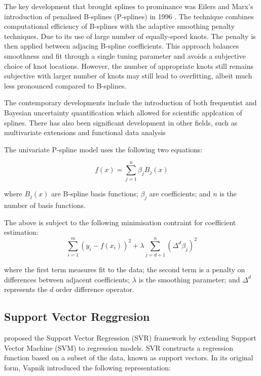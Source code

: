 \documentclass[8pt,twocolumn]{article}
\begin{document}
The key development that brought splines to prominance was Eilers and Marx's introduction
of penalised B-splines (P-splines) in 1996 \cite{eilmarx1996}. The technique combines computational
efficiency of B-splines with the adaptive smoothing penalty techniques. Due to its use of large
number of equally-spced knots. The penalty is then applied between adjacing B-spline coefficients.
This approach balances smoothness and fit through a single tuning parameter and avoids a subjective choice
of knot locations. However, the number of appropriate knots still remains subjective with larger number
of knots may still lead to overfitting, albeit much less pronounced compared to B-splines.

The contemporary developments include the introduction of both frequentist \cite{krivo2008} and
Bayesian \cite{woods2017} uncertainty quantification which allowed for scientific applcation of splines. There has also been
significant development in other fields, such as multivariate extensions and functional data analysis \cite{woods2017}

The univariate P-spline model uses the following two equations:

\begin{equation}
    f(x) = \sum_{j=1}^{n} \beta_j B_j(x)
\end{equation}

where $B_j(x)$ are B-spline basis functions; $\beta_j$ are coefficients;
and $n$ is the number of basis functions.

The above is subject to the following minimisation contraint for coefficient estimation:
\begin{equation}
    \sum_{i=1}^{m} (y_i - f(x_i))^2 + \lambda \sum_{j=d+1}^{n} (\Delta^d \beta_j)^2
\end{equation}

where the first term measures fit to the data; the second term is a penalty on differences between adjacent coefficients;
$\lambda$ is the smoothing parameter; and $\Delta^d$ represents the $d$ order difference operator.


\subsection{Support Vector Reggresion}
\cite{vapnik1995nature} proposed the Support Vector Regression (SVR) framework
by extending Support Vector Machine (SVM) to regression models. SVR constructs a
regression function based on a subset of the data, known as support vectors. In its original form, Vapnik introduced the following representation:
\end{document}

